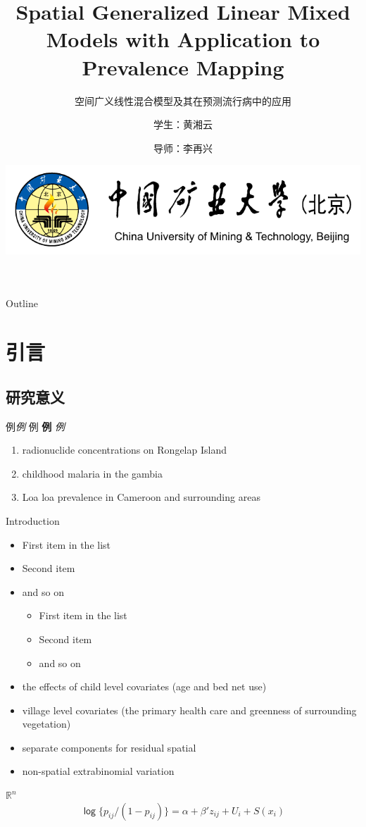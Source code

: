 \documentclass[11pt,compress,xcolor=x11names,UTF8]{beamer}
\title[Spatial Generalized Linear Mixed Models]{Spatial Generalized Linear Mixed Models with Application to Prevalence Mapping}
\subtitle{空间广义线性混合模型及其在预测流行病中的应用}
\author[黄湘云]{学生：黄湘云 \and 导师：李再兴 } %
\institute[中国矿业大学（北京）]{理学院 \and 计算数学与统计系\and 2015级硕士学位论文答辩} %
\date[\today]{\includegraphics[width=.5\textwidth]{logo}}
\begin{document}
\maketitle

\begin{frame}{Outline}
\tableofcontents
\end{frame}

\section{引言}

\subsection{研究意义}

\begin{frame}{例\emph{例} }
\textsf{例} \textbf{例}  \textit{例} 

\begin{enumerate}
\item radionuclide concentrations on Rongelap Island
\item childhood malaria in the gambia
\item Loa loa prevalence in Cameroon and surrounding areas
\end{enumerate}

\end{frame}

\begin{frame}{Introduction}
\citet{Diggle2002}
\begin{itemize}
\item First item in the list
\item Second item
\item and so on
\begin{itemize}
\item First item in the list
\item Second item
\item and so on
\end{itemize}
\end{itemize}

\begin{itemize}
\item the effects of child level covariates (age and bed net use)
\item village level covariates (the primary health care and greenness of surrounding vegetation)
\item separate components for residual spatial
\item non-spatial extrabinomial variation
\end{itemize}
$\mathbb{R}^{n}$
$$ \mathsf{\log} \{p_{ij}/(1-p_{ij})\} =\alpha + \beta'z_{ij} + U_{i} + S(x_{i})$$

\end{frame}
\end{document}
